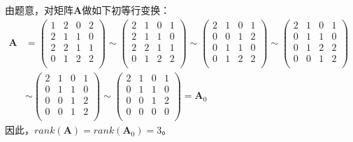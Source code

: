 \begin{Solution}
    由题意，对矩阵$\bm{A}$做如下初等行变换：\\

    $
    \begin{aligned}
        \bm{A} &= \left(
        \begin{smallmatrix}
            1 &2 &0 &2\\
            2 &1 &1 &0\\
            2 &2 &1 &1\\
            0 &1 &2 &2\\
        \end{smallmatrix}
    \right)
    \sim
    \left(
        \begin{smallmatrix}
            2 &1 &0 &1\\
            2 &1 &1 &0\\
            2 &2 &1 &1\\
            0 &1 &2 &2\\
        \end{smallmatrix}
    \right)
    \sim
    \left(
        \begin{smallmatrix}
            2 &1 &0 &1\\
            0 &0 &1 &2\\
            0 &1 &1 &0\\
            0 &1 &2 &2\\
        \end{smallmatrix}
    \right)
    \sim
    \left(
        \begin{smallmatrix}
            2 &1 &0 &1\\
            0 &1 &1 &0\\
            0 &1 &2 &2\\
            0 &0 &1 &2\\
        \end{smallmatrix}
    \right)\\
    &\sim
    \left(
        \begin{smallmatrix}
            2 &1 &0 &1\\
            0 &1 &1 &0\\
            0 &0 &1 &2\\
            0 &0 &1 &2\\
        \end{smallmatrix}
    \right)
    \sim
    \left(
        \begin{smallmatrix}
            2 &1 &0 &1\\
            0 &1 &1 &0\\
            0 &0 &1 &2\\
            0 &0 &0 &0\\
        \end{smallmatrix}
    \right)= \bm{A}_0
    \end{aligned} 
    $\\

    因此，$rank(\bm{A})=rank(\bm{A}_0) = 3$。
\end{Solution}


